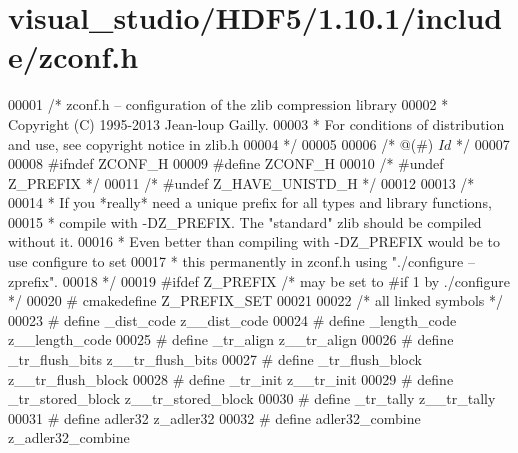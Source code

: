 \hypertarget{visual__studio_2_h_d_f5_21_810_81_2include_2zconf_8h_source}{}\section{visual\+\_\+studio/\+H\+D\+F5/1.10.1/include/zconf.h}
\label{visual__studio_2_h_d_f5_21_810_81_2include_2zconf_8h_source}

\begin{DoxyCode}
00001 \textcolor{comment}{/* zconf.h -- configuration of the zlib compression library}
00002 \textcolor{comment}{ * Copyright (C) 1995-2013 Jean-loup Gailly.}
00003 \textcolor{comment}{ * For conditions of distribution and use, see copyright notice in zlib.h}
00004 \textcolor{comment}{ */}
00005 
00006 \textcolor{comment}{/* @(#) $Id$ */}
00007 
00008 \textcolor{preprocessor}{#ifndef ZCONF\_H}
00009 \textcolor{preprocessor}{#define ZCONF\_H}
00010 \textcolor{comment}{/* #undef Z\_PREFIX */}
00011 \textcolor{comment}{/* #undef Z\_HAVE\_UNISTD\_H */}
00012 
00013 \textcolor{comment}{/*}
00014 \textcolor{comment}{ * If you *really* need a unique prefix for all types and library functions,}
00015 \textcolor{comment}{ * compile with -DZ\_PREFIX. The "standard" zlib should be compiled without it.}
00016 \textcolor{comment}{ * Even better than compiling with -DZ\_PREFIX would be to use configure to set}
00017 \textcolor{comment}{ * this permanently in zconf.h using "./configure --zprefix".}
00018 \textcolor{comment}{ */}
00019 \textcolor{preprocessor}{#ifdef Z\_PREFIX     }\textcolor{comment}{/* may be set to #if 1 by ./configure */}\textcolor{preprocessor}{}
00020 \textcolor{preprocessor}{#  cmakedefine Z\_PREFIX\_SET}
00021 
00022 \textcolor{comment}{/* all linked symbols */}
00023 \textcolor{preprocessor}{#  define \_dist\_code            z\_\_dist\_code}
00024 \textcolor{preprocessor}{#  define \_length\_code          z\_\_length\_code}
00025 \textcolor{preprocessor}{#  define \_tr\_align             z\_\_tr\_align}
00026 \textcolor{preprocessor}{#  define \_tr\_flush\_bits        z\_\_tr\_flush\_bits}
00027 \textcolor{preprocessor}{#  define \_tr\_flush\_block       z\_\_tr\_flush\_block}
00028 \textcolor{preprocessor}{#  define \_tr\_init              z\_\_tr\_init}
00029 \textcolor{preprocessor}{#  define \_tr\_stored\_block      z\_\_tr\_stored\_block}
00030 \textcolor{preprocessor}{#  define \_tr\_tally             z\_\_tr\_tally}
00031 \textcolor{preprocessor}{#  define adler32               z\_adler32}
00032 \textcolor{preprocessor}{#  define adler32\_combine       z\_adler32\_combine}

\end{DoxyCode}
